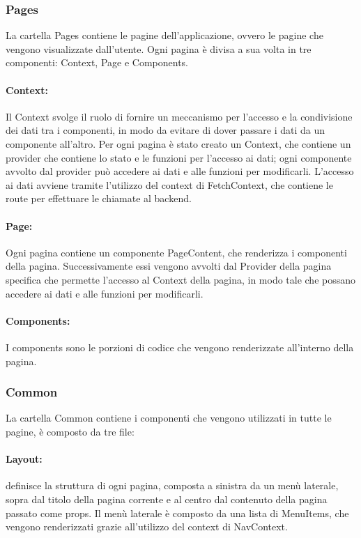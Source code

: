 \subsubsection{Pages}
La cartella Pages contiene le pagine dell'applicazione, ovvero le pagine che vengono visualizzate dall'utente. Ogni pagina è divisa a sua volta in tre componenti: Context, Page e Components.\\

\paragraph{Context:}
Il Context svolge il ruolo di fornire un meccanismo per l'accesso e la condivisione dei dati tra i componenti, in modo da evitare di dover passare i dati da un componente all'altro. Per ogni pagina è stato creato un Context, che contiene un provider che contiene lo stato e le funzioni per l'accesso ai dati; ogni componente avvolto dal provider può accedere ai dati e alle funzioni per modificarli. L'accesso ai dati avviene tramite l'utilizzo del context di FetchContext, che contiene le route per effettuare le chiamate al backend.\\

\paragraph{Page:}
Ogni pagina contiene un componente PageContent, che renderizza i componenti della pagina. Successivamente essi vengono avvolti dal Provider della pagina specifica che permette l'accesso al Context della pagina, in modo tale che possano accedere ai dati e alle funzioni per modificarli.\\

\paragraph{Components:}
I components sono le porzioni di codice che vengono renderizzate all'interno della pagina.

\subsubsection{Common}
La cartella Common contiene i componenti che vengono utilizzati in tutte le pagine, è composto da tre file:

\paragraph{Layout:} definisce la struttura di ogni pagina, composta a sinistra da un menù laterale, sopra dal titolo della pagina corrente e al centro dal contenuto della pagina passato come props.
Il menù laterale è composto da una lista di MenuItems, che vengono renderizzati grazie all'utilizzo del context di NavContext.
